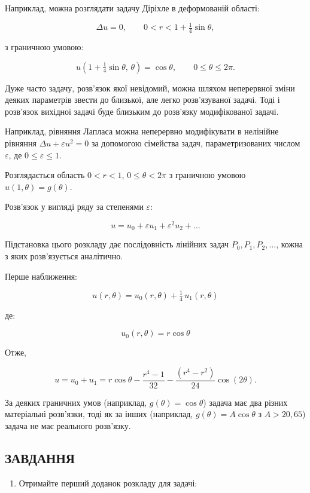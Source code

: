 \documentclass[
  ukrainian,
]{article}
\providecommand{\tightlist}{%
  \setlength{\itemsep}{0pt}\setlength{\parskip}{0pt}}
\begin{document}
Наприклад, можна розглядати задачу Діріхле в деформованій області:

\[
\Delta u = 0, \qquad 0 < r < 1 + \tfrac{1}{4}\sin\theta,
\]

з граничною умовою:

\[
u\!\left(1+\tfrac{1}{4}\sin\theta,\,\theta\right) = \cos\theta, \qquad 0 \le \theta \le 2\pi.
\]

Дуже часто задачу, розв'язок якої невідомий, можна шляхом неперервної
зміни деяких параметрів звести до близької, але легко розв'язуваної
задачі. Тоді і розв'язок вихідної задачі буде близьким до розв'язку
модифікованої задачі.

Наприклад, рівняння Лапласа можна неперервно модифікувати в нелінійне
рівняння \(\Delta u + \varepsilon u^2 = 0\) за допомогою сімейства
задач, параметризованих числом \(\varepsilon\), де
\(0 \le \varepsilon \le 1\).

Розглядається область \(0 < r < 1\), \(0 \le \theta < 2\pi\) з граничною
умовою \(u(1,\theta) = g(\theta)\).

Розв'язок у вигляді ряду за степенями \(\varepsilon\):

\[
u = u_0 + \varepsilon u_1 + \varepsilon^2 u_2 + \dots
\]

Підстановка цього розкладу дає послідовність лінійних задач
\(P_0, P_1, P_2, \ldots\), кожна з яких розв'язується аналітично.

Перше наближення:

\[
u(r,\theta) = u_0(r,\theta) + \tfrac{1}{4}\,u_1(r,\theta)
\]

де:

\[
u_0(r,\theta) = r\cos\theta
\]

Отже,

\[
u = u_0 + u_1 = r\cos\theta - \frac{r^4-1}{32} - \frac{(r^4-r^2)}{24}\cos(2\theta).
\]

За деяких граничних умов (наприклад, \(g(\theta) = \cos\theta\)) задача
має два різних матеріальні розв'язки, тоді як за інших (наприклад,
\(g(\theta) = A\cos\theta\) з \(A > 20{,}65\)) задача не має реального
розв'язку.

\subsection{ЗАВДАННЯ}\label{ux437ux430ux432ux434ux430ux43dux43dux44f-25}

\begin{enumerate}
\def\labelenumi{\arabic{enumi}.}
\tightlist
\item
  Отримайте перший доданок розкладу для задачі:
\end{enumerate}
\end{document}
